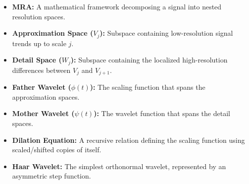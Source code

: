 \documentclass[12pt,a4paper]{article}
\begin{document}
\begin{tcolorbox}[defbox, title={\textbf{One-Line Definitions}}]
\begin{itemize}[leftmargin=*, itemsep=3.5pt]
  \item \textbf{MRA:} A mathematical framework decomposing a signal into nested resolution spaces.
  \item \textbf{Approximation Space ($V_j$):} Subspace containing low-resolution signal trends up to scale $j$.
  \item \textbf{Detail Space ($W_j$):} Subspace containing the localized high-resolution differences between $V_j$ and $V_{j+1}$.
  \item \textbf{Father Wavelet ($\phi(t)$):} The scaling function that spans the approximation spaces.
  \item \textbf{Mother Wavelet ($\psi(t)$):} The wavelet function that spans the detail spaces.
  \item \textbf{Dilation Equation:} A recursive relation defining the scaling function using scaled/shifted copies of itself.
  \item \textbf{Haar Wavelet:} The simplest orthonormal wavelet, represented by an asymmetric step function.
\end{itemize}
\end{tcolorbox}
\end{document}
